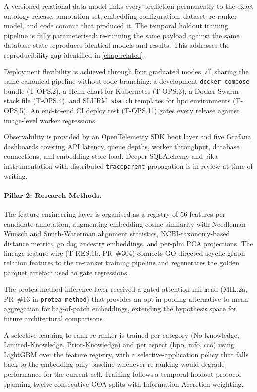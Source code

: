 A versioned relational data model links every prediction permanently to
the exact ontology release, annotation set, embedding configuration,
dataset, re-ranker model, and code commit that produced it. The temporal
holdout training pipeline is fully parameterised: re-running the same
payload against the same database state reproduces identical models and
results. This addresses the reproducibility gap identified in
\cref{chap:related}.

Deployment flexibility is achieved through four graduated modes, all
sharing the same canonical pipeline without code branching: a development
\texttt{docker compose} bundle (T-OPS.2), a Helm chart for Kubernetes
(T-OPS.3), a Docker Swarm stack file (T-OPS.4), and SLURM~\texttt{sbatch}
templates for \gls{hpc} environments (T-OPS.5). An end-to-end CI deploy test
(T-OPS.11) gates every release against image-level worker regressions.

Observability is provided by an OpenTelemetry SDK boot layer and five
Grafana dashboards covering API latency, queue depths, worker throughput,
database connections, and embedding-store load. Deeper SQLAlchemy and pika
instrumentation with distributed \texttt{traceparent} propagation is in
review at time of writing.

\paragraph{Pillar 2: Research Methods.}

The feature-engineering layer is organised as a registry of 56 features
per candidate annotation, augmenting embedding cosine similarity with
Needleman-Wunsch and Smith-Waterman alignment statistics,
NCBI-taxonomy-based distance metrics, \gls{go} \gls{dag} ancestry
embeddings, and per-\gls{plm} PCA projections. The lineage-feature wire
(T-RES.1b, PR~\#304) connects GO directed-acyclic-graph relation
features to the re-ranker training pipeline and regenerates the golden
parquet artefact used to gate regressions.

The protea-method inference layer received a gated-attention
\gls{mil} head (MIL.2a, PR~\#13 in
\texttt{protea-method}) that provides an opt-in pooling alternative to
mean aggregation for bag-of-patch embeddings, extending the hypothesis
space for future architectural comparisons.

A selective learning-to-rank re-ranker is trained per category
(No-Knowledge, Limited-Knowledge, Prior-Knowledge) and per aspect
(\gls{bpo}, \gls{mfo}, \gls{cco}) using LightGBM over the feature registry, with a
selective-application policy that falls back to the embedding-only
baseline whenever re-ranking would degrade performance for the current
cell. Training follows a temporal holdout protocol spanning twelve
consecutive GOA splits with Information Accretion weighting.


